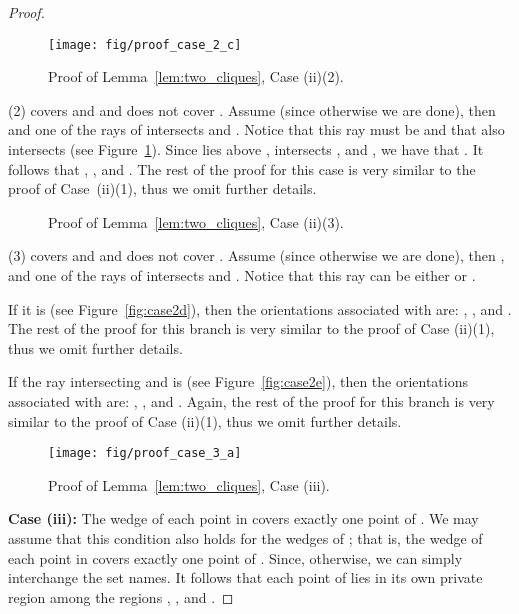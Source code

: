 \documentclass[11pt]{article}
\begin{document}
{\begin{proof}
\begin{figure}[htb]
 \centering
       \texttt{[image: fig/proof\_case\_2\_c]}
 \caption{Proof of Lemma~\ref{lem:two_cliques}, Case (ii)(2).}	\label{fig:case2c}	
\end{figure} 
  
(2)  covers  and  and does not cover . Assume  (since otherwise
we are done), then 
and one of the rays of  intersects  and . Notice that this ray must be  and that  also intersects  (see Figure~\ref{fig:case2c}).
Since  lies above ,  intersects , and , we have that . 
It follows that , , and . The rest of the proof for this case is very similar to the proof of Case~(ii)(1), thus we omit further details.

\begin{figure}[htb]
 \centering 
 \caption{Proof of Lemma~\ref{lem:two_cliques}, Case (ii)(3).}	\label{fig:caseb}
\end{figure}

 
(3)  covers  and  and does not cover . Assume  (since otherwise
we are done), then ,
and one of the rays of  intersects  and . Notice that this ray 
can be either  or . 

If it is  (see Figure~\ref{fig:case2d}), then
the orientations associated with  are:
, , and .
The rest of the proof for this branch is very similar to the proof of Case (ii)(1), thus we omit further details.

If the ray intersecting  and  is  (see Figure~\ref{fig:case2e}), then
the orientations associated with  are:
, , and .
Again, the rest of the proof for this branch is very similar to the proof of Case (ii)(1), thus we omit further details.

\begin{figure}[htb]
 \centering 
    \texttt{[image: fig/proof\_case\_3\_a]}
 \label{fig:case3a}
 \caption{Proof of Lemma~\ref{lem:two_cliques}, Case (iii).}	\label{fig:case3}
\end{figure}

{\bf Case (iii):} The wedge of each point in  covers exactly one point of . We may assume that this condition also holds for the wedges of ; that is, the wedge of each point in  covers exactly one point of . Since, otherwise, we can simply interchange the set names. 
It follows that each point of  lies in its own private region among the regions , , and . 


\end{proof}}
\end{document}
